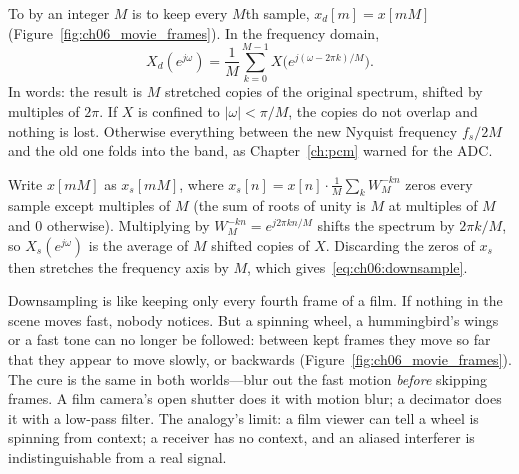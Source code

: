 To  by an integer $M$ is to keep every $M$th sample, $x_d[m]=x[mM]$
(Figure~\ref{fig:ch06_movie_frames}). In the frequency domain,
\begin{equation}
X_d(e^{j\omega})=\frac{1}{M}\sum_{k=0}^{M-1}X\bigl(e^{j(\omega-2\pi k)/M}\bigr).
\label{eq:ch06:downsample}
\end{equation}
In words: the result is $M$ stretched copies of the original spectrum, shifted by multiples of
$2\pi$. If $X$ is confined to $|\omega|<\pi/M$, the copies do not overlap and nothing is lost.
Otherwise everything between the new Nyquist frequency $f_s/2M$ and the old one folds into the band,
as Chapter~\ref{ch:pcm} warned for the ADC.

\begin{deeper}
Write $x[mM]$ as $x_s[mM]$, where $x_s[n]=x[n]\cdot\frac1M\sum_kW_M^{-kn}$ zeros every sample except
multiples of $M$ (the sum of roots of unity is $M$ at multiples of $M$ and 0 otherwise). Multiplying
by $W_M^{-kn}=e^{j2\pi kn/M}$ shifts the spectrum by $2\pi k/M$, so $X_s(e^{j\omega})$ is the
average of $M$ shifted copies of $X$. Discarding the zeros of $x_s$ then stretches the frequency
axis by $M$, which gives~\eqref{eq:ch06:downsample}.
\end{deeper}

\begin{analogy}
Downsampling is like keeping only every fourth frame of a film. If nothing in the scene moves fast,
nobody notices. But a spinning wheel, a hummingbird's wings or a fast tone can no longer be followed:
between kept frames they move so far that they appear to move slowly, or backwards
(Figure~\ref{fig:ch06_movie_frames}). The cure is the same in both worlds---blur out the fast motion
\emph{before} skipping frames. A film camera's open shutter does it with motion blur; a decimator
does it with a low-pass filter. The analogy's limit: a film viewer can tell a wheel is spinning from
context; a receiver has no context, and an aliased interferer is indistinguishable from a real
signal.
\end{analogy}


